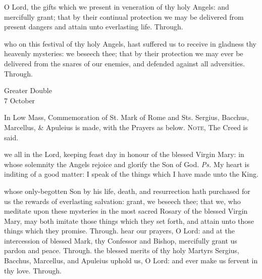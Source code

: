 
\vspace{-1ex}

\secret
{} O Lord, the gifts which we present in veneration of thy holy Angels: and mercifully grant; that by their continual protection we may be delivered from present dangers and attain unto everlasting life. Through.


\vspace{-1ex}

\postcommunion
{} who on this festival of thy holy Angels, hast suffered us to receive in gladness thy heavenly mysteries: we beseech thee; that by their protection we may ever be delivered from the snares of our enemies, and defended against all adversities. Through.

\begin{inhead}
	{Greater Double\\
		7 October}
\end{inhead}
\begin{rubric}
	In Low Mass, Commemoration of St. Mark of Rome and Sts. Sergius, Bacchus, Marcellus, \& Apuleius is made, with the Prayers as below.
	\textsc{Note,} The Creed is said.
\end{rubric}

\introit
{} we all in the Lord, keeping feast day in honour of the blessed Virgin Mary: in whose solemnity the Angels rejoice and glorify the Son of God. \textit{Ps.} My heart is inditing of a good matter: I speak of the things which I have made unto the King.

\collect
{} whose only-begotten Son by his life, death, and resurrection hath purchased for us the rewards of everlasting salvation: grant, we beseech thee; that we, who meditate upon these mysteries in the most sacred Rosary of the blessed Virgin Mary, may both imitate those things which they set forth, and attain unto those things which they promise. Through.
 hear our prayers, O Lord: and at the intercession of blessed Mark, thy Confessor and Bishop, mercifully grant us pardon and peace. Through.
 the blessed merits of thy holy Martyrs Sergius, Bacchus, Marcellus, and Apuleius uphold us, O Lord: and ever make us fervent in thy love. Through.


